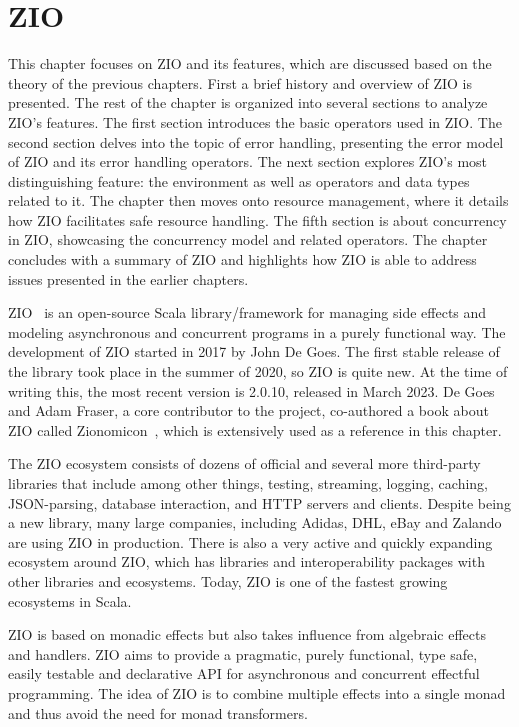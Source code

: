 \chapter{ZIO} \label{zio}
This chapter focuses on ZIO and its features, which are discussed based on the theory of the previous chapters. First a brief history and overview of ZIO is presented. The rest of the chapter is organized into several sections to analyze ZIO's features. The first section introduces the basic operators used in ZIO. The second section delves into the topic of error handling, presenting the error model of ZIO and its error handling operators. The next section explores ZIO's most distinguishing feature: the environment as well as operators and data types related to it. The chapter then moves onto resource management, where it details how ZIO facilitates safe resource handling. The fifth section is about concurrency in ZIO, showcasing the concurrency model and related operators. The chapter concludes with a summary of ZIO and highlights how ZIO is able to address issues presented in the earlier chapters.

ZIO~\cite{zio} is an open-source Scala library/framework for managing side effects and modeling asynchronous and concurrent programs in a purely functional way. The development of ZIO started in 2017 by John De Goes. The first stable release of the library took place in the summer of 2020, so ZIO is quite new. At the time of writing this, the most recent version is 2.0.10, released in March 2023. De Goes and Adam Fraser, a core contributor to the project, co-authored a book about ZIO called Zionomicon~\cite{zionomicon}, which is extensively used as a reference in this chapter.

The ZIO ecosystem consists of dozens of official and several more third-party libraries that include among other things, testing, streaming, logging, caching, JSON-parsing, database interaction, and HTTP servers and clients. Despite being a new library, many large companies, including Adidas, DHL, eBay and Zalando are using ZIO in production. There is also a very active and quickly expanding ecosystem around ZIO, which has libraries and interoperability packages with other libraries and ecosystems. Today, ZIO is one of the fastest growing ecosystems in Scala.

ZIO is based on monadic effects but also takes influence from algebraic effects and handlers. ZIO aims to provide a pragmatic, purely functional, type safe, easily testable and declarative API for asynchronous and concurrent effectful programming. The idea of ZIO is to combine multiple effects into a single monad and thus avoid the need for monad transformers.

